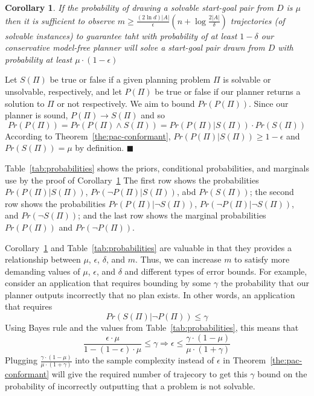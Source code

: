 \documentclass{article}
\newtheorem{corollary}{Corollary}
\newenvironment{proof}{\noindent{\bf Proof:~~}}{\qed}
\newcommand{\qed}{\hfill\ensuremath{\blacksquare}}
\newcommand{\solvable}{\textit{S}}
\newcommand{\plannable}{\textit{P}}
\begin{document}
	\begin{corollary}
		If the probability of drawing a solvable start-goal pair from $D$ is $\mu$ then it is sufficient to 
		observe $m\geq\frac{(2\ln  d)|A|}{\epsilon}(n+\log\frac{2|A|}{\delta})$
		trajectories (of solvable instances) to guarantee taht with probability of at least $1-\delta$ our conservative model-free planner will solve a start-goal pair drawn from $D$ with probability at least $\mu\cdot(1-\epsilon)$ 
\label{cor:unsolvable}
	\end{corollary}
\begin{proof}
	Let $\solvable(\Pi)$ be true or false if  a given planning problem $\Pi$ is solvable or unsolvable, respectively, 
	and let $\plannable(\Pi)$ be true or false if our planner returns a solution to $\Pi$ or not respectively. We aim to bound $Pr(\plannable(\Pi))$. Since our planner is sound, $\plannable(\Pi)\rightarrow \solvable(\Pi)$ and so
	\[ Pr(\plannable(\Pi))= Pr(\plannable(\Pi)\wedge \solvable(\Pi))= Pr(\plannable(\Pi)|\solvable(\Pi))\cdot Pr(\solvable(\Pi)) \]
	According to Theorem~\ref{the:pac-conformant}, 
	$Pr(\plannable(\Pi)|\solvable(\Pi))\geq 1-\epsilon$ 
	and $Pr(\solvable(\Pi))=\mu$ by definition. 
\end{proof}

Table~\ref{tab:probabilities} shows the priors, conditional probabilities, and marginals use by the proof of Corollary~\ref{cor:unsolvable}
The first row shows the probabilities 
	$Pr(\plannable(\Pi)|\solvable(\Pi))$, 
	$Pr(\neg\plannable(\Pi)|\solvable(\Pi))$, abd
	$Pr(\solvable(\Pi))$; 
	the second row shows the probabilities 
	$Pr(\plannable(\Pi)|\neg\solvable(\Pi))$, 
	$Pr(\neg\plannable(\Pi)|\neg\solvable(\Pi))$, and
	$Pr(\neg\solvable(\Pi))$;  	
	and the last row shows the marginal probabilities
	$Pr(\plannable(\Pi))$ and  
	$Pr(\neg\plannable(\Pi))$. 
	
	Corollary~\ref{cor:unsolvable} and Table~\ref{tab:probabilities} are valuable in that they provides a relationship between $\mu$, $\epsilon$, $\delta$, and $m$. Thus, we can increase $m$ to satisfy more demanding values of $\mu$, $\epsilon$, and $\delta$ and different types of error bounds. For example, consider an application that requires bounding by some $\gamma$ the probability that our planner outputs incorrectly that no plan exists. In other words, an application that requires 
	\[ Pr(\solvable(\Pi)|\neg\plannable(\Pi))\leq \gamma \]
	Using Bayes rule and the values from Table~\ref{tab:probabilities}, this means that 
	\[ \frac{\epsilon\cdot\mu}{1-(1-\epsilon)\cdot\mu}\leq \gamma \Rightarrow  \epsilon\leq \frac{\gamma\cdot (1-\mu)}{\mu\cdot (1+\gamma)}\]
	\noindent Plugging $\frac{\gamma\cdot (1-\mu)}{\mu\cdot (1+\gamma)}$ into the sample complexity instead of $\epsilon$ in Theorem~\ref{the:pac-conformant} will give the required number of trajecory to get this $\gamma$ bound on the probability of incorrectly outputting that a problem is not solvable. 
	
\end{document}

